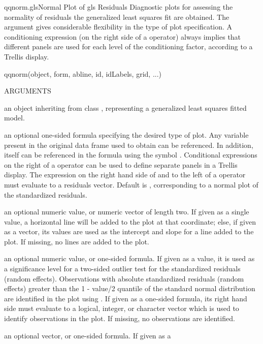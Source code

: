 \documentclass[pdftex]{article} \usepackage{url,graphicx}
\renewcommand{\Twiddle}{\mbox{\(\sim\)}}
\begin{document}
\begin{Helpfile}{qqnorm.gls}{Normal Plot of gls Residuals}
Diagnostic plots for assessing the normality of residuals the
generalized least squares fit are obtained. The  argument
gives considerable flexibility in the type of plot specification. A
conditioning expression (on the right side of a \Co{|} operator)
always implies that different panels are used for each level of the
conditioning factor, according to a Trellis display.
\begin{Example}
qqnorm(object, form, abline, id, idLabels, grid, ...)
\end{Example}
\begin{Argument}{ARGUMENTS}
\item[\Co{object:}]
an object inheriting from class , representing
a generalized least squares fitted model.
\item[\Co{form:}]
an optional one-sided formula specifying the desired type of
plot. Any variable present in the original data frame used to obtain
 can be referenced. In addition,  itself
can be referenced in the formula using the symbol
. Conditional expressions on the right of a \Co{|}
operator can be used to define separate panels in a Trellis
display. The expression on the right hand side of  and to
the left of a \Co{|} operator must evaluate to a residuals
vector. Default is \Co{{\Twiddle} resid(., type = "p")}, 
corresponding to a normal plot of the standardized residuals.
\item[\Co{abline:}]
an optional numeric value, or numeric vector of length
two. If given as a single value, a horizontal line will be added to the
plot at that coordinate; else, if given as a vector, its values are
used as the intercept and slope for a line added to the plot. If
missing, no lines are added to the plot.
\item[\Co{id:}]
an optional numeric value, or one-sided formula. If given as
a value, it is used as a significance level for a two-sided outlier
test for the standardized residuals (random effects). Observations with
absolute standardized residuals (random effects) greater than the
1 - value/2 quantile of the standard normal distribution are
identified in the plot using . If given as a one-sided
formula, its right hand side must evaluate to a  logical, integer, or
character vector which is used to identify observations in the
plot. If missing, no observations are identified.
\item[\Co{idLabels:}]
an optional vector, or one-sided formula. If given as a

\end{Argument}
\end{Helpfile}
\end{document}
